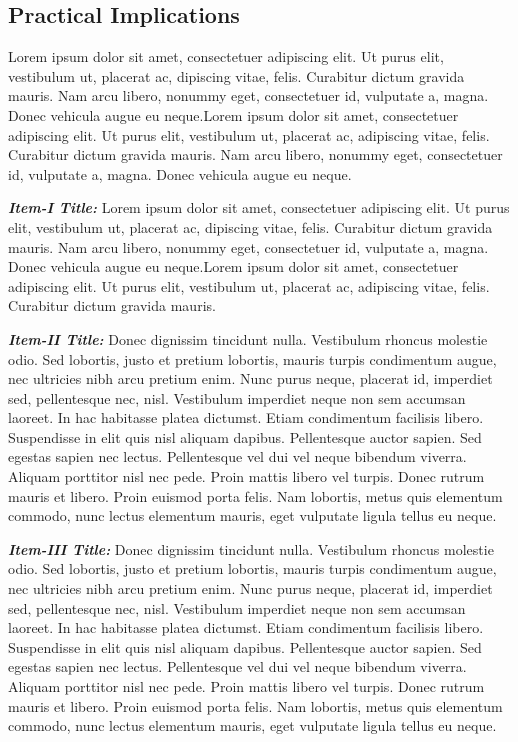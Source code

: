 \documentclass{article}
\begin{document}
\subsection{Practical Implications}
\noindent
Lorem ipsum dolor sit amet, consectetuer adipiscing elit. Ut purus elit, vestibulum ut, placerat ac, dipiscing vitae, felis. Curabitur dictum gravida mauris. Nam arcu libero, nonummy eget, consectetuer id, vulputate a, magna. Donec vehicula augue eu neque.Lorem ipsum dolor sit amet, consectetuer adipiscing elit. Ut purus elit, vestibulum ut, placerat ac,
adipiscing vitae, felis. Curabitur dictum gravida mauris. Nam arcu libero, nonummy eget, consectetuer id, vulputate a, magna. Donec vehicula augue eu neque.
\vspace{2mm}

\noindent
\textbf{\textit{Item-I Title:}} Lorem ipsum dolor sit amet, consectetuer adipiscing elit. Ut purus elit, vestibulum ut, placerat ac, dipiscing vitae, felis. Curabitur dictum gravida mauris. Nam arcu libero, nonummy eget, consectetuer id, vulputate a, magna. Donec vehicula augue eu neque.Lorem ipsum dolor sit amet, consectetuer adipiscing elit. Ut purus elit, vestibulum ut, placerat ac,
adipiscing vitae, felis. Curabitur dictum gravida mauris.
\vspace{2mm}

\noindent
\textbf{\textit{Item-II Title:}} Donec dignissim tincidunt nulla. Vestibulum rhoncus molestie odio. Sed lobortis, justo et pretium lobortis, mauris turpis condimentum augue, nec ultricies nibh arcu pretium enim. Nunc purus neque, placerat id, imperdiet sed, pellentesque nec, nisl. Vestibulum imperdiet neque non sem accumsan laoreet. In hac habitasse platea dictumst. Etiam condimentum facilisis libero. Suspendisse in elit quis nisl aliquam dapibus. Pellentesque auctor sapien. Sed egestas sapien nec lectus. Pellentesque vel dui vel neque bibendum viverra. Aliquam porttitor nisl nec pede.
Proin mattis libero vel turpis. Donec rutrum mauris et libero. Proin euismod porta felis. Nam lobortis, metus quis elementum commodo, nunc lectus elementum mauris, eget vulputate ligula tellus eu neque.
\vspace{2mm}

\noindent
\textbf{\textit{Item-III Title:}} Donec dignissim tincidunt nulla. Vestibulum rhoncus molestie odio. Sed lobortis, justo et pretium lobortis, mauris turpis condimentum augue, nec ultricies nibh arcu pretium enim. Nunc purus neque, placerat id, imperdiet sed, pellentesque nec, nisl. Vestibulum imperdiet neque non sem accumsan laoreet. In hac habitasse platea dictumst. Etiam condimentum facilisis libero. Suspendisse in elit quis nisl aliquam dapibus. Pellentesque auctor sapien. Sed egestas sapien nec lectus. Pellentesque vel dui vel neque bibendum viverra. Aliquam porttitor nisl nec pede.
Proin mattis libero vel turpis. Donec rutrum mauris et libero. Proin euismod porta felis. Nam lobortis, metus quis elementum commodo, nunc lectus elementum mauris, eget vulputate ligula tellus eu neque.
\vspace{2mm}
\end{document}
